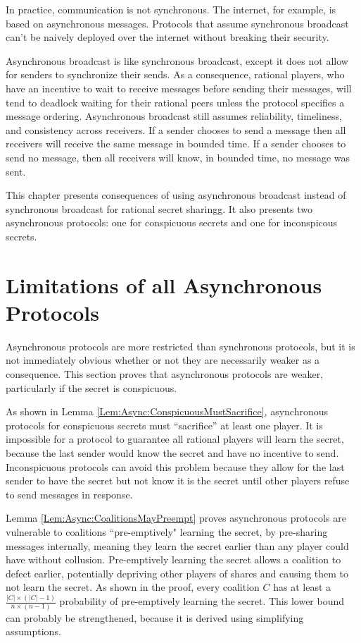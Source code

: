 \documentclass{dalcsthesis}
\begin{document}
In practice, communication is not synchronous. The internet, for example, is based on asynchronous messages. Protocols that assume synchronous broadcast can't be naively deployed over the internet without breaking their security.

Asynchronous broadcast is like synchronous broadcast, except it does not allow for senders to synchronize their sends. As a consequence, rational players, who have an incentive to wait to receive messages before sending their messages, will tend to deadlock waiting for their rational peers unless the protocol specifies a message ordering. Asynchronous broadcast still assumes reliability, timeliness, and consistency across receivers. If a sender chooses to send a message then all receivers will receive the same message in bounded time. If a sender chooses to send no message, then all receivers will know, in bounded time, no message was sent.

This chapter presents consequences of using asynchronous broadcast instead of synchronous broadcast for rational secret sharingg. It also presents two asynchronous protocols: one for conspicuous secrets and one for inconspicous secrets.

\section{Limitations of all Asynchronous Protocols}

Asynchronous protocols are more restricted than synchronous protocols, but it is not immediately obvious whether or not they are necessarily weaker as a consequence. This section proves that asynchronous protocols are weaker, particularly if the secret is conspicuous.

As shown in Lemma \ref{Lem:Async:ConspicuousMustSacrifice}, asynchronous protocols for conspicuous secrets must ``sacrifice'' at least one player. It is impossible for a protocol to guarantee all rational players will learn the secret, because the last sender would know the secret and have no incentive to send. Inconspicuous protocols can avoid this problem because they allow for the last sender to have the secret but not know it is the secret until other players refuse to send messages in response.

Lemma \ref{Lem:Async:CoalitionsMayPreempt} proves asynchronous protocols are vulnerable to coalitions ``pre-emptively" learning the secret, by pre-sharing messages internally, meaning they learn the secret earlier than any player could have without collusion. Pre-emptively learning the secret allows a coalition to defect earlier, potentially depriving other players of shares and causing them to not learn the secret. As shown in the proof, every coalition $C$ has at least a $\frac{|C| \times (|C| - 1)}{n \times (n-1)}$ probability of pre-emptively learning the secret. This lower bound can probably be strengthened, because it is derived using simplifying assumptions.
\end{document}
